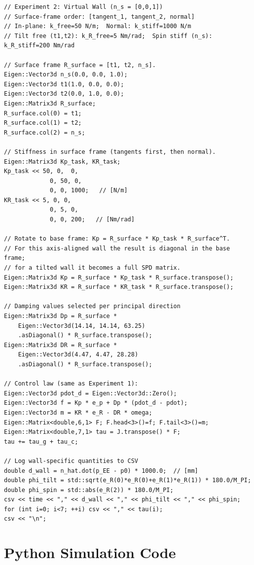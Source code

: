 \begin{lstlisting}[style=cppstyle,
  caption={Experiment 2: Virtual wall controller with CSV logging},
  label={lst:exp2}]
// Experiment 2: Virtual Wall (n_s = [0,0,1])
// Surface-frame order: [tangent_1, tangent_2, normal]
// In-plane: k_free=50 N/m;  Normal: k_stiff=1000 N/m
// Tilt free (t1,t2): k_R_free=5 Nm/rad;  Spin stiff (n_s): k_R_stiff=200 Nm/rad

// Surface frame R_surface = [t1, t2, n_s].
Eigen::Vector3d n_s(0.0, 0.0, 1.0);
Eigen::Vector3d t1(1.0, 0.0, 0.0);
Eigen::Vector3d t2(0.0, 1.0, 0.0);
Eigen::Matrix3d R_surface;
R_surface.col(0) = t1;
R_surface.col(1) = t2;
R_surface.col(2) = n_s;

// Stiffness in surface frame (tangents first, then normal).
Eigen::Matrix3d Kp_task, KR_task;
Kp_task << 50, 0,  0,
             0, 50, 0,
             0, 0, 1000;   // [N/m]
KR_task << 5, 0, 0,
             0, 5, 0,
             0, 0, 200;   // [Nm/rad]

// Rotate to base frame: Kp = R_surface * Kp_task * R_surface^T.
// For this axis-aligned wall the result is diagonal in the base frame;
// for a tilted wall it becomes a full SPD matrix.
Eigen::Matrix3d Kp = R_surface * Kp_task * R_surface.transpose();
Eigen::Matrix3d KR = R_surface * KR_task * R_surface.transpose();

// Damping values selected per principal direction
Eigen::Matrix3d Dp = R_surface *
    Eigen::Vector3d(14.14, 14.14, 63.25)
    .asDiagonal() * R_surface.transpose();
Eigen::Matrix3d DR = R_surface *
    Eigen::Vector3d(4.47, 4.47, 28.28)
    .asDiagonal() * R_surface.transpose();

// Control law (same as Experiment 1):
Eigen::Vector3d pdot_d = Eigen::Vector3d::Zero();
Eigen::Vector3d f = Kp * e_p + Dp * (pdot_d - pdot);
Eigen::Vector3d m = KR * e_R - DR * omega;
Eigen::Matrix<double,6,1> F; F.head<3>()=f; F.tail<3>()=m;
Eigen::Matrix<double,7,1> tau = J.transpose() * F;
tau += tau_g + tau_c;

// Log wall-specific quantities to CSV
double d_wall = n_hat.dot(p_EE - p0) * 1000.0;  // [mm]
double phi_tilt = std::sqrt(e_R(0)*e_R(0)+e_R(1)*e_R(1)) * 180.0/M_PI;
double phi_spin = std::abs(e_R(2)) * 180.0/M_PI;
csv << time << "," << d_wall << "," << phi_tilt << "," << phi_spin;
for (int i=0; i<7; ++i) csv << "," << tau(i);
csv << "\n";
\end{lstlisting}

\section{Python Simulation Code}

